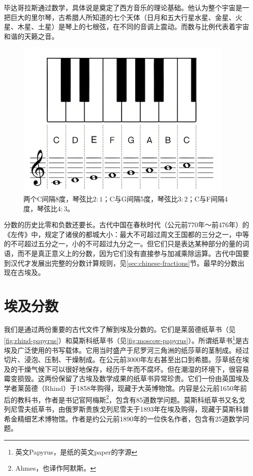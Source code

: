 \documentclass[b5paper]{ctexart}
\begin{document}
毕达哥拉斯通过数学，具体说是奠定了西方音乐的理论基础。他认为整个宇宙是一把巨大的里尔琴，古希腊人所知道的七个天体（日月和五大行星水星、金星、火星、木星、土星）是琴上的七根弦，在不同的音调上震动。而数与比例代表着宇宙和谐的天籁之音。

\begin{figure}[htbp]
 \centering
 \includegraphics[scale=0.4]{img/octave}
 \caption{两个C间隔8度，琴弦比$2:1$；C与G间隔5度，琴弦比$3:2$；C与F间隔4度，琴弦比$4:3$。}
 \label{fig:octave}
\end{figure}

分数的历史比零和负数还要长。古代中国在春秋时代（公元前770年～前476年）的《左传》中，规定了诸侯的都城大小：最大不可超过周文王国都的三分之一，中等的不可超过五分之一，小的不可超过九分之一。但它们只是表达某种部分的量的词语，而不是真正意义上的分数，因为它们没有直接参与加减乘除运算。古代中国要到汉代才发展出完整的分数计算规则，见\ref{sec:chinese-fractions}节。最早的分数出现在古埃及。

\section{埃及分数}
我们是通过两份重要的古代文件了解到埃及分数的。它们是莱茵德纸草书（见\cref{fig:rhind-papyrus}）和莫斯科纸草书（见\cref{fig:moscow-papyrus}）。所谓纸草书\footnote{英文Papyrus，是纸的英文paper的字源}是古埃及广泛使用的书写载体。它用当时盛产于尼罗河三角洲的纸莎草的茎制成。经过切片、浸泡、压制、干燥制成。在公元前3000年左右甚至出口到希腊。莎草纸在埃及的干燥气候下可以很好地保存，经历千年而不腐坏。但在潮湿的环境下，很容易霉变损毁。这两份保留了古埃及数学成果的纸草书异常珍贵。它们一份由英国埃及学者莱茵德（Rhind）于1858年购得，现藏于大英博物馆。内容是公元前1650年前后的教科书，作者是书记官阿梅斯\footnote{Ahmes，也译作阿默斯。}，包含有85道数学问题。莫斯科纸草书又名戈列尼雪夫纸草书，由俄罗斯贵族戈列尼雪夫于1893年在埃及购得，现藏于莫斯科普希金精细艺术博物馆。作者是约公元前1890年的一位佚名作者，包含有25道数学问题。
\end{document}
